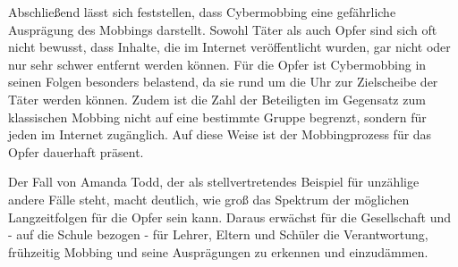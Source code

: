 Abschließend lässt sich feststellen, dass Cybermobbing eine gefährliche Ausprägung des Mobbings darstellt.
Sowohl Täter als auch Opfer sind sich oft nicht bewusst, dass Inhalte, die im Internet veröffentlicht wurden, gar nicht oder nur sehr schwer entfernt werden können.
Für die Opfer ist Cybermobbing in seinen Folgen besonders belastend, da sie rund um die Uhr zur Zielscheibe der Täter werden können.
Zudem ist die Zahl der Beteiligten im Gegensatz zum klassischen Mobbing nicht auf eine bestimmte Gruppe begrenzt, sondern für jeden im Internet zugänglich.
Auf diese Weise ist der Mobbingprozess für das Opfer dauerhaft präsent.

Der Fall von Amanda Todd, der als stellvertretendes Beispiel für unzählige andere Fälle steht, macht deutlich, wie groß das Spektrum der möglichen Langzeitfolgen für die Opfer sein kann.
Daraus erwächst für die Gesellschaft und - auf die Schule bezogen - für Lehrer, Eltern und Schüler die Verantwortung, frühzeitig Mobbing und seine Ausprägungen zu erkennen und einzudämmen.
